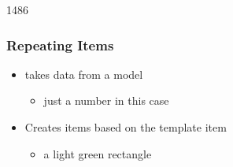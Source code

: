 
\begin{slide}{1486}\frametitle{Repeating Items}


\begin{itemize}
\item {} takes data from a model
  \begin{itemize}
  \item just a number in this case
  \end{itemize}
\item Creates items based on the template item
  \begin{itemize}
  \item a light green rectangle
  \end{itemize}
\end{itemize} 


\end{slide}


